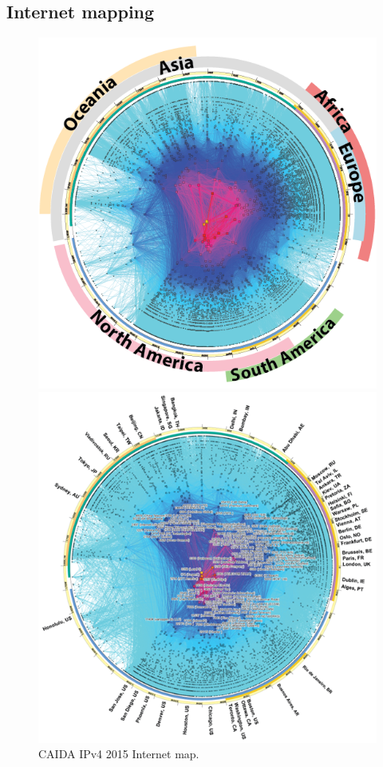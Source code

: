 
\subsection{Internet mapping}

\begin{figure}[H]
  \centering
  \begin{minipage}[b]{0.4\textwidth}
    \includegraphics[scale=0.35]{img/caida2015.png}
    \decoRule
    \caption{CAIDA IPv4 2015 Internet map.}
    \label{fig:caida2015}
  \end{minipage}
  \hfill
  \begin{minipage}[b]{0.4\textwidth}
    \includegraphics[scale=0.35]{img/caida2017.png}

\end{minipage}
\end{figure}

